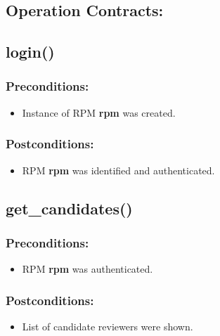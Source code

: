 
\subsection*{Operation Contracts:}
\subsection*{login()}

\subsubsection*{Preconditions:}
\begin{itemize}
\itemsep-1.5em 
    \item Instance of RPM \textbf{rpm} was created.
    
  
   
\end{itemize}



\subsubsection*{Postconditions:}
\begin{itemize}
\itemsep-1.5em 
   \item RPM \textbf{rpm} was identified and authenticated.

\end{itemize}





\subsection*{get\_candidates()}

\subsubsection*{Preconditions:}
\begin{itemize}
\itemsep-1.5em 
    \item RPM \textbf{rpm} was authenticated.
    
  
   
\end{itemize}



\subsubsection*{Postconditions:}
\begin{itemize}
\itemsep-1.5em 
   \item List of candidate reviewers were shown.

\end{itemize}








